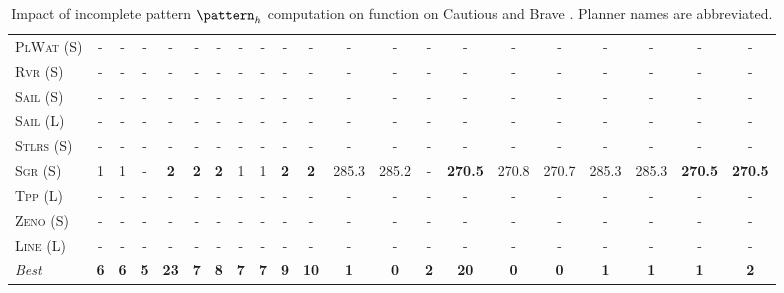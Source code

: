 \documentclass[11pt,landscape]{article}
\begin{document}
\begin{table}[tb]
{\begin{tabular}{|l||cccccccccc||cccccccccc||}
\textsc{PlWat} (S)&-&-&-&-&-&-&-&-&-&-&-&-&-&-&-&-&-&-&-&-\\
\textsc{Rvr} (S)&-&-&-&-&-&-&-&-&-&-&-&-&-&-&-&-&-&-&-&-\\
\textsc{Sail} (S)&-&-&-&-&-&-&-&-&-&-&-&-&-&-&-&-&-&-&-&-\\
\textsc{Sail} (L)&-&-&-&-&-&-&-&-&-&-&-&-&-&-&-&-&-&-&-&-\\
\textsc{Stlrs} (S)&-&-&-&-&-&-&-&-&-&-&-&-&-&-&-&-&-&-&-&-\\
\textsc{Sgr} (S)&1&1&-&\textbf{2}&\textbf{2}&\textbf{2}&1&1&\textbf{2}&\textbf{2}&285.3&285.2&-&\textbf{270.5}&270.8&270.7&285.3&285.3&\textbf{270.5}&\textbf{270.5}\\
\textsc{Tpp} (L)&-&-&-&-&-&-&-&-&-&-&-&-&-&-&-&-&-&-&-&-\\
\textsc{Zeno} (S)&-&-&-&-&-&-&-&-&-&-&-&-&-&-&-&-&-&-&-&-\\
\textsc{Line} (L)&-&-&-&-&-&-&-&-&-&-&-&-&-&-&-&-&-&-&-&-
\\\hline
\textit{Best}&\textbf{6}&\textbf{6}&\textbf{5}&\textbf{23}&\textbf{7}&\textbf{8}&\textbf{7}&\textbf{7}&\textbf{9}&\textbf{10}&\textbf{1}&\textbf{0}&\textbf{2}&\textbf{20}&\textbf{0}&\textbf{0}&\textbf{1}&\textbf{1}&\textbf{1}&\textbf{2}\\\hline

        \end{tabular}}
        \caption{Impact of incomplete pattern $\pattern_h$ computation on function on Cautious and Brave \pattyd. Planner names are abbreviated.}
        \label{tab:abl-patternh-incomplete}
        \end{table}
        
\end{document}
